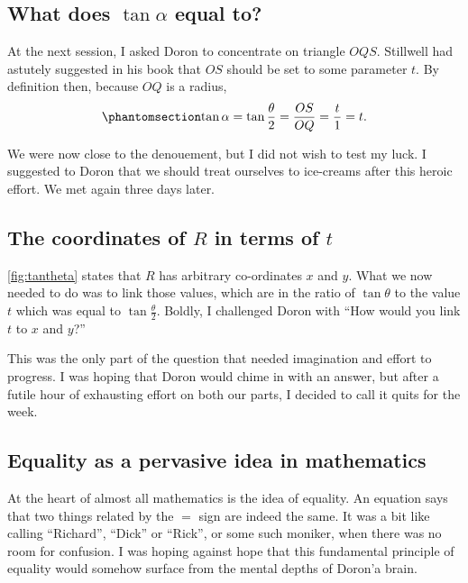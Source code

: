 \documentclass[
  a4paper,
]{article}
\begin{document}
\subsection{\texorpdfstring{What does \(\tan\alpha\) equal
to?}{What does \textbackslash tan\textbackslash alpha equal to?}}\label{what-does-tanalpha-equal-to}

At the next session, I asked Doron to concentrate on triangle \(OQS\).
Stillwell had astutely suggested in his book that \(OS\) should be set
to some parameter \(t\). By definition then, because \(OQ\) is a radius,
\begin{equation}\phantomsection\label{eq:halftheta}{
\tan\alpha = \tan\frac{\theta}{2} = \frac{OS}{OQ} = \frac{t}{1} = t.
}\end{equation}

We were now close to the denouement, but I did not wish to test my luck.
I suggested to Doron that we should treat ourselves to ice-creams after
this heroic effort. We met again three days later.

\subsection{\texorpdfstring{The coordinates of \(R\) in terms of
\(t\)}{The coordinates of R in terms of t}}\label{the-coordinates-of-r-in-terms-of-t}

\cref{fig:tantheta} states that \(R\) has arbitrary co-ordinates \(x\)
and \(y\). What we now needed to do was to link those values, which are
in the ratio of \(\tan\theta\) to the value \(t\) which was equal to
\(\tan\frac{\theta}{2}\). Boldly, I challenged Doron with ``How would
you link \(t\) to \(x\) and \(y\)?''

This was the only part of the question that needed imagination and
effort to progress. I was hoping that Doron would chime in with an
answer, but after a futile hour of exhausting effort on both our parts,
I decided to call it quits for the week.

\subsection{Equality as a pervasive idea in
mathematics}\label{equality-as-a-pervasive-idea-in-mathematics}

At the heart of almost all mathematics is the idea of equality. An
equation says that two things related by the \(=\) sign are indeed the
same. It was a bit like calling ``Richard'', ``Dick'' or ``Rick'', or
some such moniker, when there was no room for confusion. I was hoping
against hope that this fundamental principle of equality would somehow
surface from the mental depths of Doron'a brain.
\end{document}
